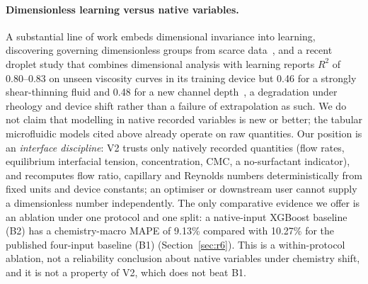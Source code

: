 \documentclass[11pt,a4paper]{article}
\begin{document}
\paragraph{Dimensionless learning versus native variables.} A substantial
line of work embeds dimensional invariance into learning, discovering
governing dimensionless groups from scarce data~\cite{xie2022,oppenheimer2023},
and a recent droplet study that combines dimensional analysis with learning
reports $R^2$ of 0.80--0.83 on unseen viscosity curves in its training device
but 0.46 for a strongly shear-thinning fluid and 0.48 for a new channel
depth~\cite{labchip2025dimless}, a degradation under rheology and device
shift rather than a failure of extrapolation as such. We do not
claim that modelling in native recorded variables is new or better; the
tabular microfluidic models cited above already operate on raw quantities. Our position is an
\emph{interface discipline}: V2 trusts only natively recorded quantities
(flow rates, equilibrium interfacial tension, concentration, CMC, a
no-surfactant indicator), and recomputes flow ratio, capillary and Reynolds
numbers deterministically from fixed units and device constants; an
optimiser or downstream user cannot supply a dimensionless number
independently. The only comparative
evidence we offer is an ablation under one protocol and one split: a
native-input XGBoost baseline (B2) has a chemistry-macro MAPE of 9.13\%
compared with 10.27\% for the published four-input baseline (B1)
(Section~\ref{sec:r6}). This is a within-protocol ablation, not a reliability
conclusion about native variables under chemistry shift, and it is not a
property of V2, which does not beat B1.
\end{document}
